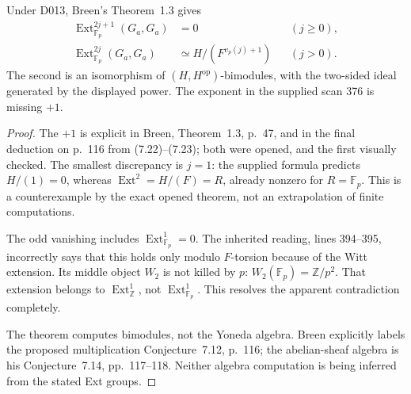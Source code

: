 \begin{theorem}\label{sa08:D018}
Under D013, Breen's Theorem~1.3 gives
\begin{align*}
 \operatorname{Ext}^{2j+1}_{\mathbb F_p}(G_a,G_a)&=0
       &&(j\geq0),\\
 \operatorname{Ext}^{2j}_{\mathbb F_p}(G_a,G_a)
       &\simeq H/(F^{v_p(j)+1})&&(j>0).
\end{align*}
The second is an isomorphism of $(H,H^{\mathrm{op}})$-bimodules,
with the two-sided ideal generated by the displayed power.
The exponent in the supplied scan 376 is missing $+1$.
\end{theorem}
\begin{proof}
The $+1$ is explicit in Breen, Theorem~1.3, p.~47, and in the
final deduction on p.~116 from (7.22)--(7.23); both were opened,
and the first visually checked. The smallest discrepancy is
$j=1$: the supplied formula predicts $H/(1)=0$, whereas
$\operatorname{Ext}^2=H/(F)=R$, already nonzero for
$R=\mathbb F_p$. This is a counterexample by the exact opened
theorem, not an extrapolation of finite computations.

The odd vanishing includes $\operatorname{Ext}^1_{\mathbb F_p}=0$.
The inherited reading, lines 394--395, incorrectly says that this
holds only modulo $F$-torsion because of the Witt extension.
Its middle object $W_2$ is not killed by $p$:
$W_2(\mathbb F_p)=\mathbb Z/p^2$. That extension belongs to
$\operatorname{Ext}^1_{\mathbb Z}$, not
$\operatorname{Ext}^1_{\mathbb F_p}$. This resolves the apparent
contradiction completely.

The theorem computes bimodules, not the Yoneda algebra.
Breen explicitly labels the proposed multiplication
Conjecture~7.12, p.~116; the abelian-sheaf algebra is his
Conjecture~7.14, pp.~117--118. Neither algebra computation is
being inferred from the stated Ext groups.
\end{proof}

